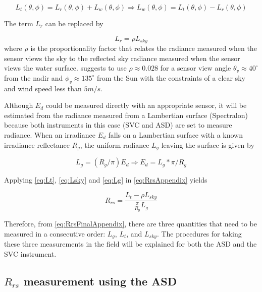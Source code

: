 \begin{appendices}
\begin{equation}\label{eq:Lt}
	L_t(\theta,\phi) = L_r(\theta,\phi)+L_w(\theta,\phi)\Rightarrow L_w(\theta,\phi)=L_t(\theta,\phi) - L_r(\theta,\phi)
\end{equation}

The term $L_r$ can be replaced by

\begin{equation}\label{eq:Lsky}
	L_r = \rho L_{sky}
\end{equation}
where $\rho$ is the proportionality factor that relates the radiance measured when the sensor views the sky to the reflected sky radiance measured when the sensor views the water surface. \citet{Mobley:1999} suggests to use $\rho \approx 0.028$ for a sensor view angle $\theta_v \approx 40^\circ$ from the nadir and  $\phi_v \approx 135^\circ$ from the Sun with the constraints of a clear sky and wind speed less than $5m/s$.

Although $E_d$ could be measured directly with an appropriate sensor, it will be estimated from the radiance measured from a Lambertian surface (Spectralon) because both instruments in this case (SVC and ASD) are set to measure radiance. When an irradiance $E_d$ falls on a Lambertian surface with a known irradiance reflectance $R_g$, the uniform radiance $L_g$ leaving the surface is given by 

\begin{equation}\label{eq:Lg}
	L_g = (R_g/\pi)E_d\Rightarrow E_d = L_g*\pi/R_g
\end{equation}

Applying \autoref{eq:Lt}, \autoref{eq:Lsky} and \autoref{eq:Lg} in \autoref{eq:RrsAppendix} yields

\begin{equation}\label{eq:RrsFinalAppendix}
	R_{rs} = \frac{L_t-\rho L_{sky}}{\frac{\displaystyle \pi}{\displaystyle R_g}L_g}
\end{equation}

Therefore, from \autoref{eq:RrsFinalAppendix}, there are three quantities that need to be measured in a consecutive order: $L_g$, $L_t$, and $L_{sky}$. The procedures for taking these three measurements in the field will be explained for both the ASD and the SVC instrument.

\subsection{\texorpdfstring{$R_{rs}$}{Rrs} measurement using the ASD}


\end{appendices}
